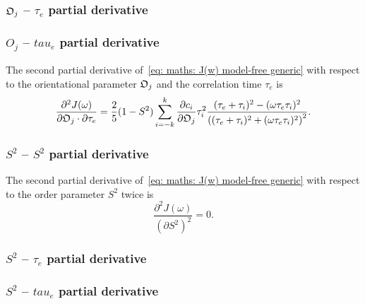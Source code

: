 \begin{latexonly}
    \subsubsection{$\mathfrak{O}_j$ -- $\tau_e$ partial derivative}
\end{latexonly}
\begin{htmlonly}
    \subsubsection{$O_j$ -- $tau_e$ partial derivative}
\end{htmlonly}

The second partial derivative of~\eqref{eq: maths: J(w) model-free generic} with respect to the orientational parameter $\mathfrak{O}_j$ and the correlation time $\tau_e$ is
\begin{equation}
    \frac{\partial^2 J(\omega)}{\partial \mathfrak{O}_j \cdot \partial \tau_e} = \frac{2}{5} (1 - S^2) \sum_{i=-k}^k
        \frac{\partial c_i}{\partial \mathfrak{O}_j} \tau_i^2
        \frac{(\tau_e + \tau_i)^2 - (\omega \tau_e \tau_i)^2}{\left((\tau_e + \tau_i)^2 + (\omega \tau_e \tau_i)^2 \right)^2}.
\end{equation}



\subsubsection{$S^2$ -- $S^2$ partial derivative}

The second partial derivative of~\eqref{eq: maths: J(w) model-free generic} with respect to the order parameter $S^2$ twice is
\begin{equation}
    \frac{\partial^2 J(\omega)}{(\partial S^2)^2} = 0.
\end{equation}



\begin{latexonly}
    \subsubsection{$S^2$ -- $\tau_e$ partial derivative}
\end{latexonly}
\begin{htmlonly}
    \subsubsection{$S^2$ -- $tau_e$ partial derivative}
\end{htmlonly}

